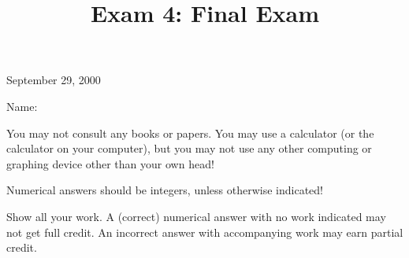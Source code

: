 \documentclass[10pt]{amsart}
\title[\hskip 0.2in Final Exam\hfill Name:\hskip 2in]{Exam 4:  Final Exam}
\begin{document}

\begin{figure}[h]
\centerline{
}
\end{figure}

\centerline{\Large{}}
\medskip

\maketitle

\vfill


\centerline{\LARGE{September 29, 2000}}

\vskip 1in

\hskip 2in\Large{Name:}

\vskip 1in

\noindent You may  not consult any books or papers.  You may use a
calculator (or the calculator on your computer), but you may not use
any other computing or graphing device other than your own head!

Numerical answers should be integers, unless otherwise indicated!

Show all your work.  A (correct) numerical answer with no work indicated
may not get full credit.  An incorrect answer with accompanying work may
earn partial credit.

\vfill\pagebreak
\end{document}
